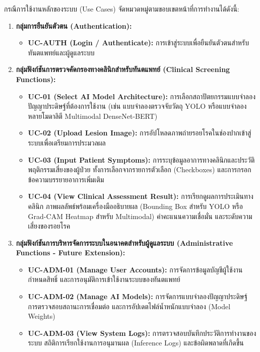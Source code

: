 กรณีการใช้งานหลักของระบบ (Use Cases) จัดหมวดหมู่ตามขอบเขตหน้าที่การทำงานได้ดังนี้:
\begin{enumerate}
    \item \textbf{กลุ่มการยืนยันตัวตน (Authentication):}
    \begin{itemize}
        \item \textbf{UC-AUTH (Login / Authenticate):} การเข้าสู่ระบบเพื่อยืนยันตัวตนสำหรับทันตแพทย์และผู้ดูแลระบบ
    \end{itemize}
    \item \textbf{กลุ่มฟังก์ชันการตรวจคัดกรองทางคลินิกสำหรับทันตแพทย์ (Clinical Screening Functions):}
    \begin{itemize}
        \item \textbf{UC-01 (Select AI Model Architecture):} การเลือกสถาปัตยกรรมแบบจำลองปัญญาประดิษฐ์ที่ต้องการใช้งาน (เช่น แบบจำลองตรวจจับวัตถุ YOLO หรือแบบจำลองหลายโมดาลิตี Multimodal DenseNet-BERT)
        \item \textbf{UC-02 (Upload Lesion Image):} การอัปโหลดภาพถ่ายรอยโรคในช่องปากเข้าสู่ระบบเพื่อเตรียมการประมวลผล
        \item \textbf{UC-03 (Input Patient Symptoms):} การระบุข้อมูลอาการทางคลินิกและประวัติพฤติกรรมเสี่ยงของผู้ป่วย ทั้งการเลือกจากรายการตัวเลือก (Checkboxes) และการกรอกข้อความบรรยายอาการเพิ่มเติม
        \item \textbf{UC-04 (View Clinical Assessment Result):} การเรียกดูผลการประเมินทางคลินิก ภาพผลลัพธ์พร้อมเครื่องมืออธิบายผล (Bounding Box สำหรับ YOLO หรือ Grad-CAM Heatmap สำหรับ Multimodal) ค่าคะแนนความเชื่อมั่น และระดับความเสี่ยงของรอยโรค
    \end{itemize}
    \item \textbf{กลุ่มฟังก์ชันการบริหารจัดการระบบในอนาคตสำหรับผู้ดูแลระบบ (Administrative Functions - Future Extension):}
    \begin{itemize}
        \item \textbf{UC-ADM-01 (Manage User Accounts):} การจัดการข้อมูลบัญชีผู้ใช้งาน กำหนดสิทธิ์ และการอนุมัติการเข้าใช้งานระบบของทันตแพทย์
        \item \textbf{UC-ADM-02 (Manage AI Models):} การจัดการแบบจำลองปัญญาประดิษฐ์ การตรวจสอบสถานะการเชื่อมต่อ และการอัปเดตไฟล์น้ำหนักแบบจำลอง (Model Weights)
        \item \textbf{UC-ADM-03 (View System Logs):} การตรวจสอบบันทึกประวัติการทำงานของระบบ สถิติการเรียกใช้งานการอนุมานผล (Inference Logs) และข้อผิดพลาดที่เกิดขึ้น
    \end{itemize}
\end{enumerate}

